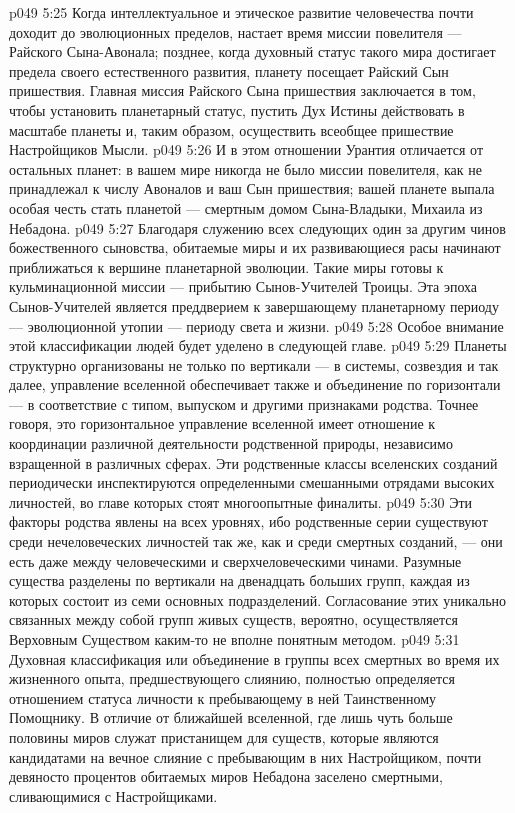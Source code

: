 \vs p049 5:25 Когда интеллектуальное и этическое развитие человечества почти доходит до эволюционных пределов, настает время миссии повелителя --- Райского Сына\hyp{}Авонала; позднее, когда духовный статус такого мира достигает предела своего естественного развития, планету посещает Райский Сын пришествия. Главная миссия Райского Сына пришествия заключается в том, чтобы установить планетарный статус, пустить Дух Истины действовать в масштабе планеты и, таким образом, осуществить всеобщее пришествие Настройщиков Мысли.
\vs p049 5:26 И в этом отношении Урантия отличается от остальных планет: в вашем мире никогда не было миссии повелителя, как не принадлежал к числу Авоналов и ваш Сын пришествия; вашей планете выпала особая честь стать планетой --- смертным домом Сына\hyp{}Владыки, Михаила из Небадона.
\vs p049 5:27 Благодаря служению всех следующих один за другим чинов божественного сыновства, обитаемые миры и их развивающиеся расы начинают приближаться к вершине планетарной эволюции. Такие миры готовы к кульминационной миссии --- прибытию Сынов\hyp{}Учителей Троицы. Эта эпоха Сынов\hyp{}Учителей является преддверием к завершающему планетарному периоду --- эволюционной утопии --- периоду света и жизни.
\vs p049 5:28 Особое внимание этой классификации людей будет уделено в следующей главе.
\vs p049 5:29 \pc {}\bibnobreakspace {} Планеты структурно организованы не только по вертикали --- в системы, созвездия и так далее, управление вселенной обеспечивает также и объединение по горизонтали --- в соответствие с типом, выпуском и другими признаками родства. Точнее говоря, это горизонтальное управление вселенной имеет отношение к координации различной деятельности родственной природы, независимо взращенной в различных сферах. Эти родственные классы вселенских созданий периодически инспектируются определенными смешанными отрядами высоких личностей, во главе которых стоят многоопытные финалиты.
\vs p049 5:30 Эти факторы родства явлены на всех уровнях, ибо родственные серии существуют среди нечеловеческих личностей так же, как и среди смертных созданий, --- они есть даже между человеческими и сверхчеловеческими чинами. Разумные существа разделены по вертикали на двенадцать больших групп, каждая из которых состоит из семи основных подразделений. Согласование этих уникально связанных между собой групп живых существ, вероятно, осуществляется Верховным Существом каким\hyp{}то не вполне понятным методом.
\vs p049 5:31 \pc {}\bibnobreakspace {} Духовная классификация или объединение в группы всех смертных во время их жизненного опыта, предшествующего слиянию, полностью определяется отношением статуса личности к пребывающему в ней Таинственному Помощнику. В отличие от ближайшей вселенной, где лишь чуть больше половины миров служат пристанищем для существ, которые являются кандидатами на вечное слияние с пребывающим в них Настройщиком, почти девяносто процентов обитаемых миров Небадона заселено смертными, сливающимися с Настройщиками.
